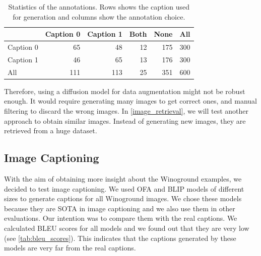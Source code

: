 \begin{table}[ht]
    \centering
    \begin{tabular}{l|rrrr|r}
    \toprule
    {} & Caption 0  &  Caption 1 &  Both &  None & All \\
    \midrule
    Caption 0    &   65 &  48 &  12 & 175 & 300\\
    Caption 1    &   46 &  65 &  13 & 176 & 300\\
    \midrule
    All  &   111 &    113 &    25 &    351 & 600\\
    \bottomrule
    \end{tabular}
    \caption{Statistics of the annotations. Rows shows the caption used for generation and columns show the annotation choice.}
    \label{tab:annotation}
\end{table}

Therefore, using a diffusion model for data augmentation might not be robust enough. It would require generating many images to get correct ones, and manual filtering to discard the wrong images. In \cref{image_retrieval}, we will test another approach to obtain similar images. Instead of generating new images, they are retrieved from a huge dataset.

\subsection{Image Captioning} \label{image_captioning}

With the aim of obtaining more insight about the Winoground examples, we decided to test image captioning. We used OFA \cite{wang2022unifying} and BLIP \cite{li2022blip} models of different sizes to generate captions for all Winoground images. We chose these models because they are SOTA in image captioning and we also use them in other evaluations. Our intention was to compare them with the real captions. We calculated BLEU scores for all models and we found out that they are very low (see \cref{tab:bleu_scores}). This indicates that the captions generated by these models are very far from the real captions.

